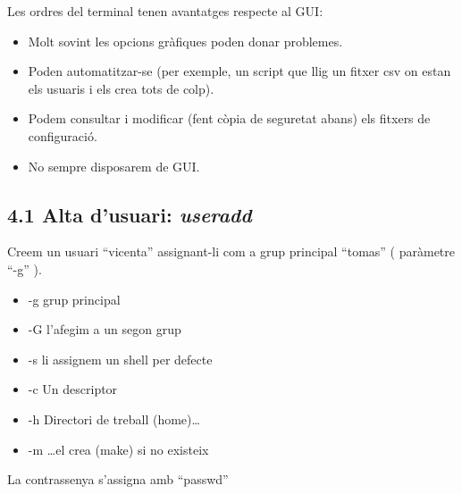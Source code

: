 \documentclass[
  a4paper,
]{article}
\newenvironment{Shaded}{\begin{snugshade}}{\end{snugshade}}
\newcommand{\AttributeTok}[1]{\textcolor[rgb]{0.13,0.29,0.53}{#1}}
\newcommand{\ExtensionTok}[1]{#1}
\newcommand{\NormalTok}[1]{#1}
\newcommand{\StringTok}[1]{\textcolor[rgb]{0.31,0.60,0.02}{#1}}
\providecommand{\tightlist}{%
  \setlength{\itemsep}{0pt}\setlength{\parskip}{0pt}}
\begin{document}
Les ordres del terminal tenen avantatges respecte al GUI:

\begin{itemize}
\tightlist
\item
  Molt sovint les opcions gràfiques poden donar problemes.
\item
  Poden automatitzar-se (per exemple, un script que llig un fitxer csv
  on estan els usuaris i els crea tots de colp).
\item
  Podem consultar i modificar (fent còpia de seguretat abans) els
  fitxers de configuració.
\item
  No sempre disposarem de GUI.
\end{itemize}

\subsection{\texorpdfstring{4.1 Alta d'usuari:
\emph{useradd}}{4.1 Alta d'usuari: useradd}}\label{alta-dusuari-useradd}

Creem un usuari ``vicenta'' assignant-li com a grup principal ``tomas''
( paràmetre ``-g'' ).

\begin{itemize}
\tightlist
\item
  -g grup principal
\item
  -G l'afegim a un segon grup
\item
  -s li assignem un shell per defecte
\item
  -c Un descriptor
\item
  -h Directori de treball (home)\ldots{}
\item
  -m \ldots el crea (make) si no existeix
\end{itemize}

La contrassenya s'assigna amb ``passwd''

\begin{Shaded}
\end{Shaded}
\end{document}
